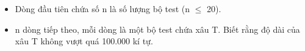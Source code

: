 \begin{itemize}
	\item     Dòng đầu tiên chứa số n là số lượng bộ test (n $\le$ 20).   
	\item     n dòng tiếp theo, mỗi dòng là một bộ test chứa xâu T. Biết rằng độ dài của xâu T không vượt quá 100.000 kí tự.   
\end{itemize}

\